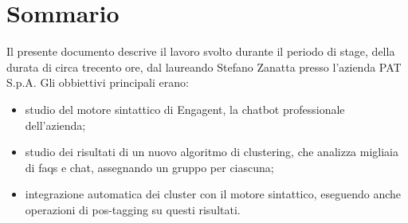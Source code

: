 
\cleardoublepage
{}
{}
\begingroup
\let\clearpage\relax
\let\cleardoublepage\relax
\let\cleardoublepage\relax

\chapter*{Sommario}

Il presente documento descrive il lavoro svolto durante il periodo di stage, della durata di circa trecento ore, dal laureando Stefano Zanatta presso l'azienda PAT S.p.A.
Gli obbiettivi principali erano:
\begin{itemize}
    \item studio del motore sintattico di Engagent, la chatbot professionale dell'azienda;
    \item studio dei risultati di un nuovo algoritmo di clustering, che analizza migliaia di faqs e chat, assegnando un gruppo per ciascuna;
    \item integrazione automatica dei cluster con il motore sintattico, eseguendo anche operazioni di pos-tagging su questi risultati.
\end{itemize}

%
%

\endgroup			

\vfill

